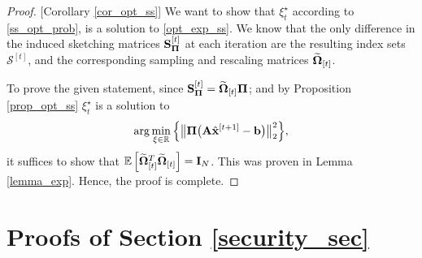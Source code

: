 \documentclass[journal,letterpaper,onecolumn,twoside,nofonttune]{IEEEtran}
\newcommand{\K}{\mathcal{K}}
\newcommand{\xb}{\bold{x}}
\newcommand{\xbh}{{\hat{\bold{x}}}}
\newcommand{\Gb}{\bold{G}}
\newcommand{\Pibold}{\bold{\Pi}}
\newcommand{\Omb}{\bold{\Omega}}
\newcommand{\Ombtp}{\tilde{\Omb}_\mathrm{p}}
\newcommand{\Ombwt}{\widetilde{\Omb}}
\newcommand{\Phib}{\bold{\Phi}}
\newcommand{\Scal}{\mathcal{S}}
\newcommand{\R}{\mathbb{R}}
\newcommand{\E}{\mathbb{E}}
\newcommand{\N}{\mathbb{N}}
\newcommand{\Sb}{\bold{S}}
\newcommand{\SbPi}{\Sb_{\Pibold}}
\newcommand{\Ab}{\bold{A}}
\newcommand{\bb}{\bold{b}}
\newcommand{\Bcal}{\mathcal{B}}
\newcommand{\eb}{\bold{e}}
\newcommand{\Ib}{\bold{I}}
\begin{document}
\begin{proof}{[Corollary \ref{cor_opt_ss}]}
We want to show that $\xi_t^{\star}$ according to \eqref{ss_opt_prob}, is a solution to \eqref{opt_exp_ss}. We know that the only difference in the induced sketching matrices $\SbPi^{[t]}$ at each iteration are the resulting index sets $\Scal^{[t]}$, and the corresponding sampling and rescaling matrices $\Ombwt_{[t]}$.

To prove the given statement, since $\SbPi^{[t]}=\Ombwt_{[t]}\Pibold$; and by Proposition \eqref{prop_opt_ss} $\xi_t^{\star}$ is a solution to
\begin{equation*}
  \arg\min_{\xi\in\R}\Big\{\big\|\Pibold\big(\Ab\xbh^{[t+1]}-\bb\big)\big\|_2^2\Big\},
\end{equation*}
it suffices to show that $\E\left[\Ombwt_{[t]}^{T}\Ombwt_{[t]}\right]=\Ib_N$. This was proven in Lemma \ref{lemma_exp}. Hence, the proof is complete. 

\end{proof}

\section{Proofs of Section \ref{security_sec}}
\end{document}

